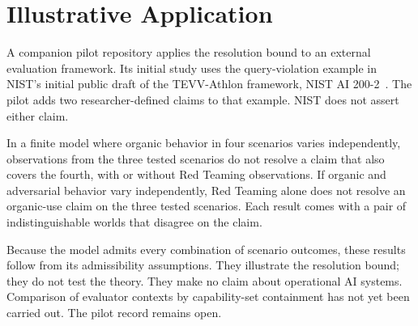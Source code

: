 \section{Illustrative Application}
\label{aa.sec.pilot}

A companion pilot repository applies the resolution bound to an external evaluation framework.
Its initial study uses the query-violation example in
NIST's initial public draft of the TEVV-Athlon framework,
NIST AI 200-2~\citep{nist2026tevvathlon}.
The pilot adds two researcher-defined claims to that example.
NIST does not assert either claim.

In a finite model where organic behavior in four scenarios varies independently,
observations from the three tested scenarios do not resolve a claim that also covers the fourth,
with or without Red Teaming observations.
If organic and adversarial behavior vary independently,
Red Teaming alone does not resolve an organic-use claim on the three tested scenarios.
Each result comes with a pair of indistinguishable worlds that disagree on the claim.

Because the model admits every combination of scenario outcomes,
these results follow from its admissibility assumptions.
They illustrate the resolution bound; they do not test the theory.
They make no claim about operational AI systems.
Comparison of evaluator contexts by capability-set containment has not yet been carried out.
The pilot record remains open.
